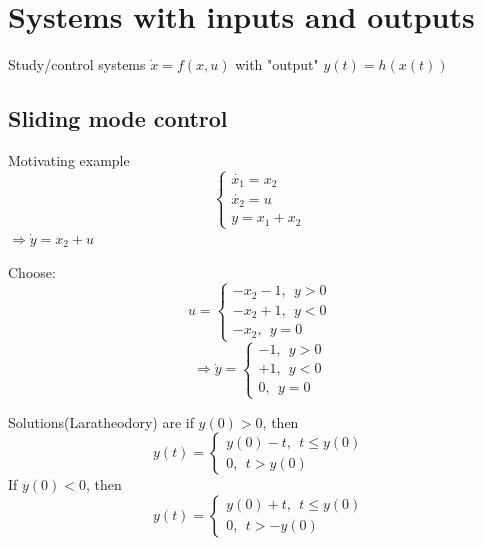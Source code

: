 \section{Systems with inputs and outputs}

Study/control systems $\dot{x} = f(x,u)$ with "output" $y(t)=h(x(t))$

\subsection{Sliding mode control}

Motivating example
\begin{equation*}
\left\{
                \begin{array}{l}
                  \dot{x_1} = x_2\\
                  \dot{x_2} = u \\
                  y = x_1 + x_2
                \end{array}
              \right. 
\end{equation*}
$\Rightarrow \dot{y} = x_2 + u$

Choose:
\begin{equation*}
u =  \left\{
                \begin{array}{ll}
                  -x_2-1, \ \ y > 0\\
                  -x_2+1, \ \ y < 0\\
                  -x_2, \ \ y=0
                \end{array}
              \right. 
\end{equation*}
\begin{equation*}
\Rightarrow \dot y =  \left\{
                \begin{array}{ll}
                  -1, \ \ y > 0\\
                  +1, \ \ y < 0\\
                  0, \ \ y=0
                \end{array}
              \right. 
\end{equation*}

Solutions(Laratheodory) are if $y(0) > 0$, then 
\begin{equation*}
y(t) = \left\{ \begin{array}{ll}
                  y(0) - t, \ \ t \leq y(0)\\
                  0, \ \ t > y(0)
                \end{array}
              \right. 
\end{equation*}
If $y(0) < 0$, then
\begin{equation*}
y(t) = \left\{ \begin{array}{ll}
                  y(0) + t, \ \ t \leq y(0)\\
                  0, \ \ t > -y(0)
                \end{array}
              \right. 
\end{equation*}

